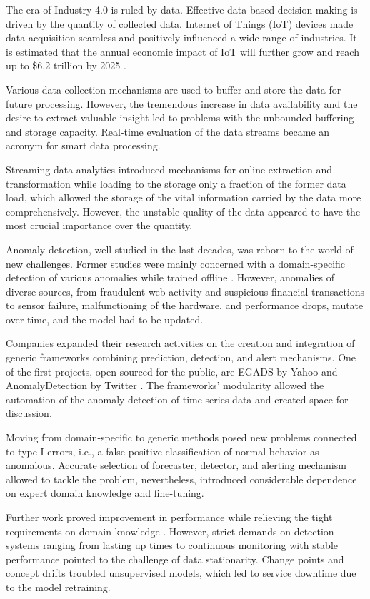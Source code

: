 The era of Industry 4.0 is ruled by data. Effective data-based decision-making is driven by the quantity of collected data. Internet of Things (IoT) devices made data acquisition seamless and positively influenced a wide range of industries. It is estimated that the annual economic impact of IoT will further grow and reach up to \$6.2 trillion by 2025 \cite{Manyika2013}. 

Various data collection mechanisms are used to buffer and store the data for future processing. However, the tremendous increase in data availability and the desire to extract valuable insight led to problems with the unbounded buffering and storage capacity. Real-time evaluation of the data streams became an acronym for smart data processing. 

Streaming data analytics introduced mechanisms for online extraction and transformation while loading to the storage only a fraction of the former data load, which allowed the storage of the vital information carried by the data more comprehensively. However, the unstable quality of the data appeared to have the most crucial importance over the quantity. 

Anomaly detection, well studied in the last decades, was reborn to the world of new challenges. Former studies were mainly concerned with a domain-specific detection of various anomalies while trained offline \cite{Chandola2009}. However, anomalies of diverse sources, from fraudulent web activity and suspicious financial transactions to sensor failure, malfunctioning of the hardware, and performance drops, mutate over time, and the model had to be updated.

Companies expanded their research activities on the creation and integration of generic frameworks combining prediction, detection, and alert mechanisms. One of the first projects, open-sourced for the public, are EGADS by Yahoo \cite{Laptev2015} and AnomalyDetection by Twitter \cite{Kejariwal2015}. The frameworks' modularity allowed the automation of the anomaly detection of time-series data and created space for discussion. 

Moving from domain-specific to generic methods posed new problems connected to type I errors, i.e., a false-positive classification of normal behavior as anomalous. Accurate selection of forecaster, detector, and alerting mechanism allowed to tackle the problem, nevertheless, introduced considerable dependence on expert domain knowledge and fine-tuning. 

Further work proved improvement in performance while relieving the tight requirements on domain knowledge \cite{Ahmad2016}. However, strict demands on detection systems ranging from lasting up times to continuous monitoring with stable performance pointed to the challenge of data stationarity. Change points and concept drifts troubled unsupervised models, which led to service downtime due to the model retraining.  

